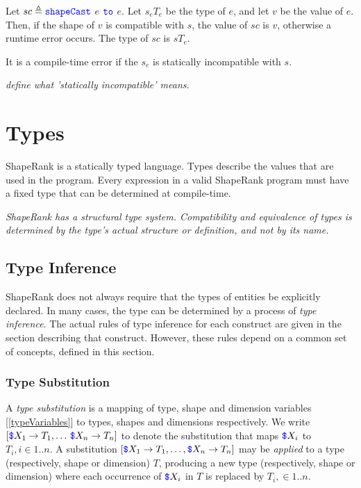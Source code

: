 \documentclass{article}
\begin{document}
{\ShapeCastExpression

Let $sc \triangleq \texttt{\color{blue} shapeCast}{}$ $e$ $\texttt{\color{blue} to}{}$ $e$.
Let $s_e T_e$ be the type of $e$, and let $v$ be the value of $e$.
Then, if the shape of $v$ is compatible with $s$, the value of $sc$ is $v$, otherwise a runtime error occurs. The type of $sc$ is $s T_e$. 

It is a compile-time error if the $s_e$ is statically incompatible with $s$.

{\em define what 'statically incompatible' means.}



\section{Types}
\label{types}

ShapeRank is a statically typed language. Types describe the values that are used in the program. Every expression in a valid ShapeRank program must have a fixed type that can be determined at compile-time.

{\em 
ShapeRank has a structural type system. Compatibility and equivalence of types is determined by the type's actual structure or definition, and not by  its name.
}

 \subsection{Type Inference}
  \label{typeInference}
  
 ShapeRank does not always require that the types of entities be explicitly declared.  In many cases, the type can be determined by a process of {\em type inference}. The actual rules of type inference for each construct are given in the section describing that construct. However, these rules depend on a common set of concepts, defined in this section.
 
  
  \subsubsection{Type Substitution}
  \label{typeSubstitution}
  
  A {\em type substitution} is a mapping of type, shape and dimension variables [\ref{typeVariables}] to types, shapes and dimensions respectively. We write $[\texttt{\color{blue} \$}{}X_1 \to T_1, \ldots\, \texttt{\color{blue} \$}{}X_n \to T_n]$ to denote the substitution that maps $\texttt{\color{blue} \$}{}X_i$ to $T_i, i \in 1..n$. A substitution $[\texttt{\color{blue} \$}{}X_1 \to T_1, \ldots, \texttt{\color{blue} \$}{}X_n \to T_n]$ may be {\em applied} to a type (respectively, shape or dimension) $T$, producing a new type (respectively, shape or dimension) where each occurrence of $\texttt{\color{blue} \$}{}X_i$ in $T$ is replaced by $T_i ,\in 1..n$.
  
}
\end{document}
